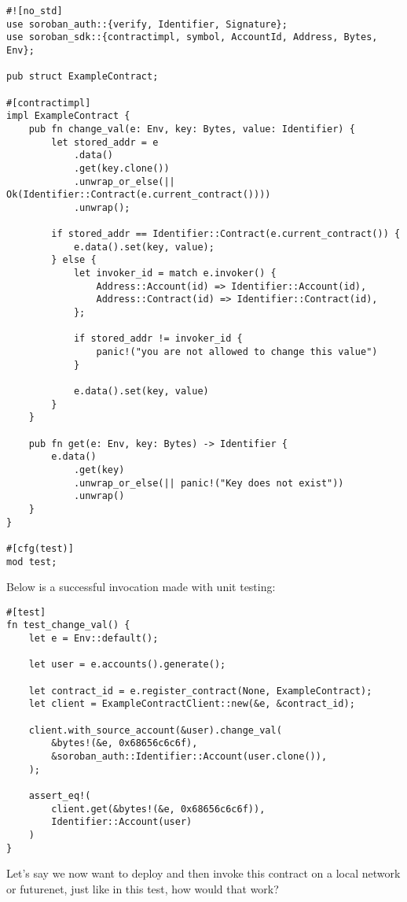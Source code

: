 \documentclass[10pt]{article}
\begin{document}
\begin{verbatim}
#![no_std]
use soroban_auth::{verify, Identifier, Signature};
use soroban_sdk::{contractimpl, symbol, AccountId, Address, Bytes, Env};

pub struct ExampleContract;

#[contractimpl]
impl ExampleContract {
    pub fn change_val(e: Env, key: Bytes, value: Identifier) {
        let stored_addr = e
            .data()
            .get(key.clone())
            .unwrap_or_else(|| Ok(Identifier::Contract(e.current_contract())))
            .unwrap();

        if stored_addr == Identifier::Contract(e.current_contract()) {
            e.data().set(key, value);
        } else {
            let invoker_id = match e.invoker() {
                Address::Account(id) => Identifier::Account(id),
                Address::Contract(id) => Identifier::Contract(id),
            };

            if stored_addr != invoker_id {
                panic!("you are not allowed to change this value")
            }

            e.data().set(key, value)
        }
    }
	
    pub fn get(e: Env, key: Bytes) -> Identifier {
        e.data()
            .get(key)
            .unwrap_or_else(|| panic!("Key does not exist"))
            .unwrap()
    }
}

#[cfg(test)]
mod test;

\end{verbatim}

Below is a successful invocation made with unit testing:

\begin{verbatim}
#[test]
fn test_change_val() {
    let e = Env::default();

    let user = e.accounts().generate();

    let contract_id = e.register_contract(None, ExampleContract);
    let client = ExampleContractClient::new(&e, &contract_id);

    client.with_source_account(&user).change_val(
        &bytes!(&e, 0x68656c6c6f),
        &soroban_auth::Identifier::Account(user.clone()),
    );

    assert_eq!(
        client.get(&bytes!(&e, 0x68656c6c6f)),
        Identifier::Account(user)
    )
}
\end{verbatim}

Let's say we now want to deploy and then invoke this contract on a local network or futurenet, just like in this test, how would that work?
\end{document}
